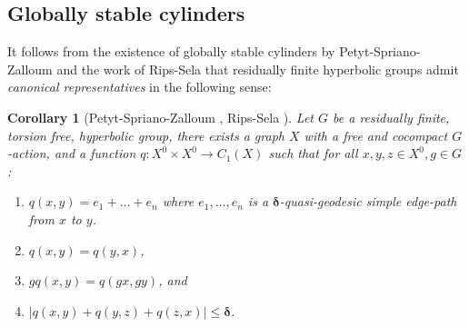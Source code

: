 \documentclass{amsart}
\numberwithin{equation}{section}
\newtheorem{corollary}[theorem]{Corollary}
\theoremstyle{definition}
\newcommand{\bdelta}{{\boldsymbol\delta}}
\begin{document}
\subsection{Globally stable cylinders}
\label{subsec: globally stable cylinder}

It follows from the existence of globally stable cylinders \cite{petyt2025stable} by Petyt-Spriano-Zalloum  and the work of Rips-Sela \cite{rips1995canonical} that residually finite hyperbolic groups admit \emph{canonical representatives} in the following sense:
\begin{corollary}[Petyt-Spriano-Zalloum \cite{petyt2025stable},  Rips-Sela \cite{rips1995canonical}]\label{the bicombing}
 Let $G$ be a residually finite, torsion free, hyperbolic group, there exists a graph $X$ with a free and cocompact $G$-action, and a function $q:X^0\times X^0 \to C_1(X)$ such that for all $x,y,z\in X^0,g\in G$:
\begin{enumerate}[label = (Q\arabic*)]
    \item \label{quasi geodesic} $q(x,y) = e_1+\dots+e_n$ where $e_1,\dots,e_n$ is a $\bdelta$-quasi-geodesic simple edge-path from $x$ to $y$.
    \item $q(x,y) = q(y,x)$, 
    \item $gq(x,y) = q(gx,gy)$, and 
    \item \label{bounded defect} $|q(x,y)+q(y,z)+q(z,x)|\le \bdelta$.
\end{enumerate}
\end{corollary}
\end{document}
